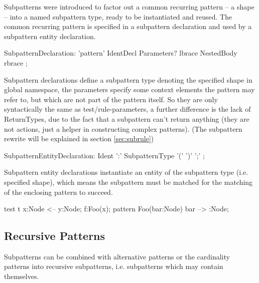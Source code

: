 Subpatterns were introduced to factor out a common recurring pattern -- a shape -- into a named subpattern type, ready to be instantiated and reused. The common recurring pattern is specified in a subpattern declaration and used by a subpattern entity declaration.

\begin{rail}  
  SubpatternDeclaration: 
    'pattern' IdentDecl Parameters? lbrace NestedBody rbrace ;
\end{rail}

Subpattern declarations define a subpattern type denoting the specified shape in global namespace, the parameters specify some context elements the pattern may refer to, but which are not part of the pattern itself. 
So they are only syntactically the same as test/rule-parameters, a further difference is the lack of ReturnTypes, due to the fact that a subpattern can't return anything (they are not actions, just a helper in constructing complex patterns).
(The subpattern rewrite will be explained in section \ref{sec:subrule})

\begin{rail}  
  SubpatternEntityDeclaration: 
    Ident ':' SubpatternType '(' ')' ';' ;
\end{rail}

Subpattern entity declarations instantiate an entity of the subpattern type (i.e. specified shape), which means the subpattern must be matched for the matching of the enclosing pattern to succeed.

\begin{example}
  \begin{grgen}
test t {
  x:Node <-- y:Node;
  f:Foo(x);
}
pattern Foo(bar:Node) {
  bar --> :Node;
}
  \end{grgen}
\end{example}


\subsection{Recursive Patterns}

Subpatterns can be combined with alternative patterns or the cardinality patterns into recursive subpatterns, i.e. subpatterns which may contain themselves.

